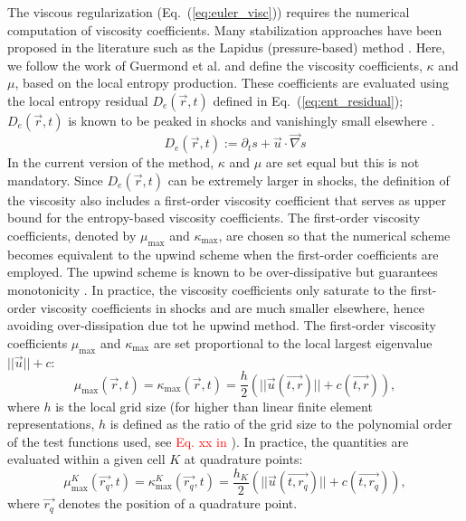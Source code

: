 \documentclass[preprint,10pt]{elsarticle}
\newcommand{\grad}{\vec{\nabla}}
\newcommand{\eqt}[1]{Eq.~(\ref{#1})}                     %
\newcommand{\tcr}[1]{\textcolor{red}{#1}}
\begin{document}
The viscous regularization (\eqt{eq:euler_visc}) requires the numerical computation of viscosity coefficients. Many stabilization approaches have been proposed in the literature such as the Lapidus (pressure-based) method \cite{Lapidus_book, Lapidus_paper}. Here, we follow the work of Guermond et al. and define the viscosity coefficients, $\kappa$ and $\mu$, based on the local entropy production. These coefficients are evaluated using the local entropy residual $D_e(\vec{r},t)$ defined in \eqt{eq:ent_residual}; $D_e(\vec{r},t)$ is known to be peaked in shocks and vanishingly small elsewhere \cite{Toro}. 
%
\begin{equation}
\label{eq:ent_residual}
D_e(\vec{r}, t) := \partial_t s + \vec{u} \cdot \grad s
\end{equation}
%
In the current version of the method, $\kappa$ and $\mu$ are set equal but this is not mandatory. Since $D_e(\vec{r},t)$ can be extremely larger in shocks, the definition of the viscosity also includes a first-order viscosity coefficient that serves as upper bound for the entropy-based viscosity coefficients. The first-order viscosity coefficients, denoted by $\mu_{\max}$ and $\kappa_{\max}$, are chosen so that the numerical scheme becomes equivalent to the upwind scheme when the first-order coefficients are employed. The upwind scheme is known to be over-dissipative but guarantees monotonicity \cite{Toro}. In practice, the viscosity coefficients only saturate to the first-order viscosity coefficients in shocks and are much smaller elsewhere, hence avoiding over-dissipation due tot he upwind method.  The first-order viscosity coefficients $\mu_{\max}$ and $\kappa_{\max}$ are set proportional to the local largest eigenvalue $|| \vec{u} || + c $:
%
\begin{equation}
\label{eq:fo}
\mu_{\max}(\vec{r}, t) = \kappa_{\max}(\vec{r}, t) = \frac{h}{2} \left( || \vec{u}(\vec{t,r}) || + c(\vec{t,r}) \right),
\end{equation}
%
where $h$ is the local grid size (for higher than linear finite element representations, $h$ is defined as the ratio of the grid size to the polynomial order of the test functions used, see \tcr{Eq. xx in \cite{jlg1}}). In practice, the quantities are evaluated within a given cell $K$ at quadrature points:
%
\begin{equation}
\label{eq:fo_quad}
\mu^K_{\max}(\vec{r_q}, t) = \kappa^K_{\max}(\vec{r_q}, t) = \frac{h_K}{2} \left( || \vec{u}(\vec{t,r_q}) || + c(\vec{t,r_q}) \right),
\end{equation}
%
where $\vec{r_q}$ denotes the position of a quadrature point.\\
\end{document}
